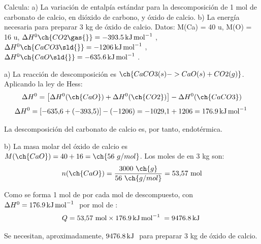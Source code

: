 \begin{exercise}
    Calcula: a) La variación de entalpía estándar para la descomposición de 1 mol de carbonato de calcio, en dióxido de carbono, y óxido de calcio. b) La energía necesaria para preparar 3 kg de óxido de calcio. Datos: M(Ca) = 40 u, M(O) = 16 u, \(\Delta H^0 \ch{CO2 \gas{}} = \energia[kjmol]{-393.5}\), \(\Delta H^0 \ch{CaCO3 \sld{}} = \energia[kjmol]{-1206}\), \(\Delta H^0 \ch{CaO \sld{}} = \energia[kjmol]{-635.6}\).

    \begin{solu}
%

        a) La reacción de descomposición es \(\ch{CaCO3 (s) -> CaO (s) + CO2 (g)}\). Aplicando la ley de Hess:
        \[
            \Delta H^0 = \left[ \Delta H^0 (\ch{CaO}) + \Delta H^0 (\ch{CO2}) \right] - \Delta H^0 (\ch{CaCO3})
        \]
        \[
            \Delta H^0 = \left[ -635{,}6 + (-393{,}5) \right] - (-1206) = -1029{,}1 + 1206 = \energia[kjmol]{176,9}
        \]

        La descomposición del carbonato de calcio es, por tanto, endotérmica.

        b) La masa molar del óxido de calcio es \(M(\ch{CaO}) = 40+16 = \ch{56\ g/mol}\). Los moles de  en 3 kg son:
        \[
            n(\ch{CaO}) = \frac{3000\ \ch{g}}{56\ \ch{g/mol}} = 53{,}57\ \text{mol}
        \]

        Como se forma 1 mol de  por cada mol de  descompuesto, con \(\Delta H^0 = \energia[kjmol]{176,9}\) por mol de :
        \[
            Q = 53{,}57\ \text{mol} \times \energia[kjmol]{176,9} = \energia[kj]{9476,8}
        \]

        Se necesitan, aproximadamente, \(\energia[kj]{9476,8}\) para preparar 3 kg de óxido de calcio.
    \end{solu}
\end{exercise}


